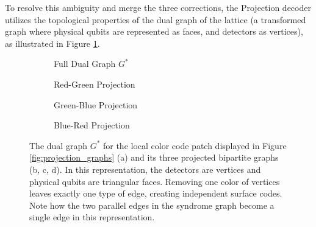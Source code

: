  To resolve this ambiguity and merge the three corrections, the Projection decoder utilizes the topological properties of the dual graph of the lattice (a transformed graph where physical qubits are represented as faces, and detectors as vertices), as illustrated in Figure \ref{fig:dual_projection_graphs}. 

\begin{figure}[hbpt]
    \centering
    \begin{subfigure}[b]{0.45\textwidth}
        \centering
        
        \caption{Full Dual Graph $G^*$}
    \end{subfigure}
    \hfill
    \begin{subfigure}[b]{0.45\textwidth}
        \centering
        
        \caption{Red-Green Projection}
    \end{subfigure}

    \vspace{0.5cm}

    \begin{subfigure}[b]{0.45\textwidth}
        \centering
        
        \caption{Green-Blue Projection}
    \end{subfigure}
    \hfill
    \begin{subfigure}[b]{0.45\textwidth}
        \centering
        
        \caption{Blue-Red Projection}
    \end{subfigure}
    \caption[Projection method on the dual graph]{The dual graph $G^*$ for the local color code patch displayed in Figure \ref{fig:projection_graphs} (a) and its three projected bipartite graphs (b, c, d). In this representation, the detectors are vertices and physical qubits are triangular faces. Removing one color of vertices leaves exactly one type of edge, creating independent surface codes. Note how the two parallel edges in the syndrome graph become a single edge in this representation.}
    \label{fig:dual_projection_graphs}
\end{figure}

